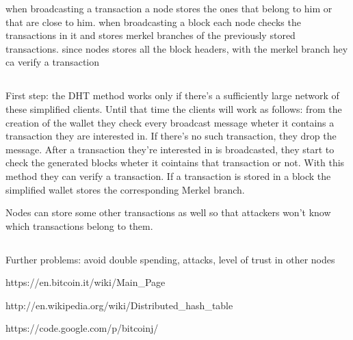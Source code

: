 \documentclass[a4paper,12pt]{article}
\begin{document}
when broadcasting a transaction a node stores the ones that belong to him or that are close to him. when broadcasting a block each node checks the transactions in it and stores merkel branches of the previously stored transactions. since nodes stores all the block headers, with the merkel branch hey ca verify a transaction



\subsection{}
First step: the DHT method works only if there's a sufficiently large network of these simplified clients. Until that time the clients will work as follows: from the creation of the wallet they check every broadcast message wheter it contains a transaction they are interested in. If there's no such transaction, they drop the message. After a transaction they're interested in is broadcasted, they start to check the generated blocks wheter it cointains that transaction or not. With this method they can verify a transaction. If a transaction is stored in a block the simplified wallet stores the corresponding Merkel branch.

Nodes can store some other transactions as well so that attackers won't know which transactions belong to them.


\subsection{}
Further problems: avoid double spending, attacks, level of trust in other nodes




\newpage
\begin{thebibliography}{9}
\bibitem{}
https://en.bitcoin.it/wiki/Main\_Page
\label{bitcoinwiki}

\bibitem{}
http://en.wikipedia.org/wiki/Distributed\_hash\_table
\label{dhtwiki}

\bibitem{}
https://code.google.com/p/bitcoinj/
\label{bitcoinj}

\end{thebibliography}
\end{document}
